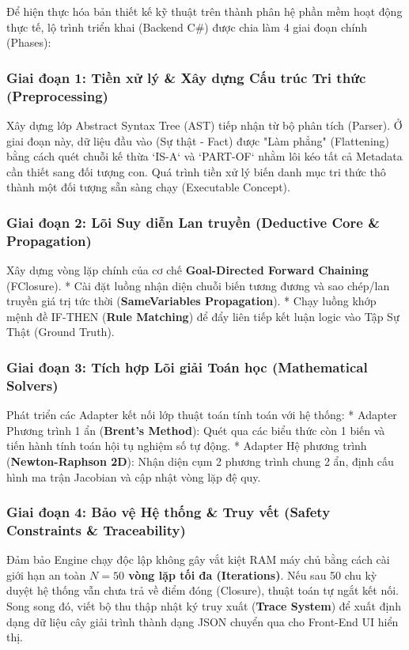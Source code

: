 Để hiện thực hóa bản thiết kế kỹ thuật trên thành phân hệ phần mềm hoạt động thực tế, lộ trình triển khai (Backend C\#) được chia làm 4 giai đoạn chính (Phases):

\subsubsection{Giai đoạn 1: Tiền xử lý & Xây dựng Cấu trúc Tri thức (Preprocessing)}
Xây dựng lớp Abstract Syntax Tree (AST) tiếp nhận từ bộ phân tích (Parser). Ở giai đoạn này, dữ liệu đầu vào (Sự thật - Fact) được "Làm phẳng" (Flattening) bằng cách quét chuỗi kế thừa `IS-A` và `PART-OF` nhằm lôi kéo tất cả Metadata cần thiết sang đối tượng con. Quá trình tiền xử lý biến danh mục tri thức thô thành một đối tượng sẵn sàng chạy (Executable Concept).

\subsubsection{Giai đoạn 2: Lõi Suy diễn Lan truyền (Deductive Core & Propagation)}
Xây dựng vòng lặp chính của cơ chế \textbf{Goal-Directed Forward Chaining} (FClosure). 
*   Cài đặt luồng nhận diện chuỗi biến tương đương và sao chép/lan truyền giá trị tức thời (\textbf{SameVariables Propagation}).
*   Chạy luồng khớp mệnh đề IF-THEN (\textbf{Rule Matching}) để đẩy liên tiếp kết luận logic vào Tập Sự Thật (Ground Truth).

\subsubsection{Giai đoạn 3: Tích hợp Lõi giải Toán học (Mathematical Solvers)}
Phát triển các Adapter kết nối lớp thuật toán tính toán với hệ thống:
*   Adapter Phương trình 1 ẩn (\textbf{Brent's Method}): Quét qua các biểu thức còn 1 biến và tiến hành tính toán hội tụ nghiệm số tự động.
*   Adapter Hệ phương trình (\textbf{Newton-Raphson 2D}): Nhận diện cụm 2 phương trình chung 2 ẩn, định cấu hình ma trận Jacobian và cập nhật vòng lặp đệ quy.

\subsubsection{Giai đoạn 4: Bảo vệ Hệ thống & Truy vết (Safety Constraints & Traceability)}
Đảm bảo Engine chạy độc lập không gây vắt kiệt RAM máy chủ bằng cách cài giới hạn an toàn \textbf{$N=50$ vòng lặp tối đa (Iterations)}. Nếu sau 50 chu kỳ duyệt hệ thống vẫn chưa trả về điểm đóng (Closure), thuật toán tự ngắt kết nối. Song song đó, viết bộ thu thập nhật ký truy xuất (\textbf{Trace System}) để xuất định dạng dữ liệu cây giải trình thành dạng JSON chuyển qua cho Front-End UI hiển thị.

